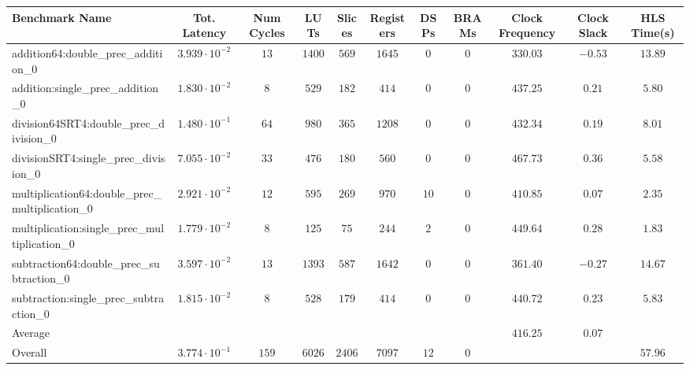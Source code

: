 \begin{tabular}{|l|c|c|c|c|c|c|c|c|c|c|}
\hline
Benchmark Name                                   & Tot. Latency            & Num Cycles & LUTs     & Slices   & Registers & DSPs   & BRAMs & Clock Frequency & Clock Slack & HLS Time(s) \\
\hline
addition64:double\_prec\_addition\_0             & $ 3.939 \cdot 10^{-2} $ & $ 13     $ & $ 1400 $ & $ 569  $ & $ 1645  $ & $ 0  $ & $ 0 $ & $ 330.03      $ & $ -0.53   $ & $ 13.89   $ \\
addition:single\_prec\_addition\_0               & $ 1.830 \cdot 10^{-2} $ & $ 8      $ & $ 529  $ & $ 182  $ & $ 414   $ & $ 0  $ & $ 0 $ & $ 437.25      $ & $ 0.21    $ & $ 5.80    $ \\
division64SRT4:double\_prec\_division\_0         & $ 1.480 \cdot 10^{-1} $ & $ 64     $ & $ 980  $ & $ 365  $ & $ 1208  $ & $ 0  $ & $ 0 $ & $ 432.34      $ & $ 0.19    $ & $ 8.01    $ \\
divisionSRT4:single\_prec\_division\_0           & $ 7.055 \cdot 10^{-2} $ & $ 33     $ & $ 476  $ & $ 180  $ & $ 560   $ & $ 0  $ & $ 0 $ & $ 467.73      $ & $ 0.36    $ & $ 5.58    $ \\
multiplication64:double\_prec\_multiplication\_0 & $ 2.921 \cdot 10^{-2} $ & $ 12     $ & $ 595  $ & $ 269  $ & $ 970   $ & $ 10 $ & $ 0 $ & $ 410.85      $ & $ 0.07    $ & $ 2.35    $ \\
multiplication:single\_prec\_multiplication\_0   & $ 1.779 \cdot 10^{-2} $ & $ 8      $ & $ 125  $ & $ 75   $ & $ 244   $ & $ 2  $ & $ 0 $ & $ 449.64      $ & $ 0.28    $ & $ 1.83    $ \\
subtraction64:double\_prec\_subtraction\_0       & $ 3.597 \cdot 10^{-2} $ & $ 13     $ & $ 1393 $ & $ 587  $ & $ 1642  $ & $ 0  $ & $ 0 $ & $ 361.40      $ & $ -0.27   $ & $ 14.67   $ \\
subtraction:single\_prec\_subtraction\_0         & $ 1.815 \cdot 10^{-2} $ & $ 8      $ & $ 528  $ & $ 179  $ & $ 414   $ & $ 0  $ & $ 0 $ & $ 440.72      $ & $ 0.23    $ & $ 5.83    $ \\
\hline
Average                                          & $                     $ & $        $ & $      $ & $      $ & $       $ & $    $ & $   $ & $ 416.25      $ & $ 0.07    $ & $         $ \\
\hline
Overall                                          & $ 3.774 \cdot 10^{-1} $ & $ 159    $ & $ 6026 $ & $ 2406 $ & $ 7097  $ & $ 12 $ & $ 0 $ & $             $ & $         $ & $ 57.96   $ \\
\hline
\end{tabular}

